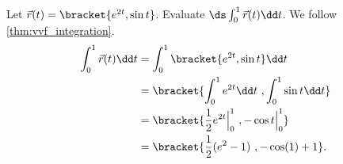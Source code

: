 \begin{example}\label{ex_vvfint1}
Let $\vec r(t) =\bracket{e^{2t},\sin t}$. Evaluate $\ds \int_0^1 \vec r(t) \dd t$.
\solution
We follow \autoref{thm:vvf_integration}.
\begin{align*}
\int_0^1 \vec r(t) \dd t &= \int_0^1\bracket{e^{2t},\sin t}\dd t \\
				&=\bracket{\int_0^1 e^{2t}\dd t\ , \int_0^1 \sin t \dd t}\\
				&=\bracket{\frac12e^{2t}\Big|_0^1\ , -\cos t\Big|_0^1}\\
				&=\bracket{\frac12(e^2-1)\ , -\cos(1)+1}
				.
\end{align*}
\end{example}

